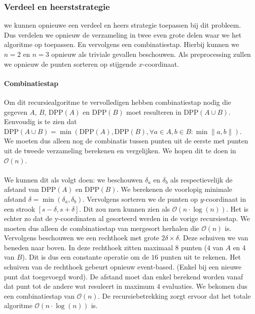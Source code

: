 \documentclass[a4paper,titlepage]{article}
\newcommand{\norm}[1]{\left\|#1\right\|}
\newcommand{\dpp}[1]{\mbox{DPP}\left(#1\right)}
\newcommand{\brak}[1]{\left(#1\right)}
\newcommand{\bigoh}[1]{\ensuremath{\mathcal{O}\left(#1\right)}}
\begin{document}
\subsubsection{Verdeel en heerststrategie}
we kunnen opnieuwe een verdeel en heers strategie toepassen bij dit probleem. Dus verdelen we opnieuw de verzameling in twee even grote delen waar we het algoritme op toepassen. En vervolgens een combinatiestap. Hierbij kunnen we $n=2$ en $n=3$ opnieuw als triviale gevallen beschouwen. Als preprocessing zullen we opnieuw de punten sorteren op stijgende $x$-coordinaat.
\paragraph{Combinatiestap}
Om dit recursiealgoritme te vervolledigen hebben combinatiestap nodig die gegeven $A$, $B$, $\dpp{A}$ en $\dpp{B}$ moet resulteren in $\dpp{A\cup B}$. Eenvoudig is te zien dat $\dpp{A\cup B}=\min\brak{\dpp{A},\dpp{B},\forall a\in A,b\in B:\min\norm{a,b}}$. We moeten dus alleen nog de combinatis tussen punten uit de eerste met punten uit de tweede verzameling berekenen en vergelijken. We hopen dit te doen in \bigoh{n}.
\paragraph{}
We kunnen dit als volgt doen: we beschouwen $\delta_a$ en $\delta_b$ als respectievelijk de afstand van $\dpp{A}$ en $\dpp{B}$. We berekenen de voorlopig minimale afstand $\delta=\min\brak{\delta_a,\delta_b}$. Vervolgens sorteren we de punten op $y$-coordinaat in een strook $\left[s-\delta,s+\delta\right]$. Dit zou men kunnen zien als \bigoh{n\cdot\log\brak{n}}. Het is echter zo dat de y-coordinaten al gesorteerd werden in de vorige recursiestap. We moeten dus alleen de combinatiestap van mergesort herhalen die \bigoh{n} is. Vervolgens beschouwen we een rechthoek met grote $2\delta\times\delta$. Deze schuiven we van beneden naar boven. In deze rechthoek zitten maximaal 8 punten ($4$ van $A$ en $4$ van $B$). Dit is dus een constante operatie om de $16$ punten uit te rekenen. Het schuiven van de rechthoek gebeurt opnieuw event-based. (Enkel bij een nieuwe punt dat toegevoegd word). De afstand moet dan enkel berekend worden vanaf dat punt tot de andere wat resuleert in maximum $4$ evaluaties. We bekomen dus een combinatiestap van \bigoh{n}. De recursiebetrekking zorgt ervoor dat het totale algoritme \bigoh{n\cdot\log\brak{n}} is.
\end{document}
